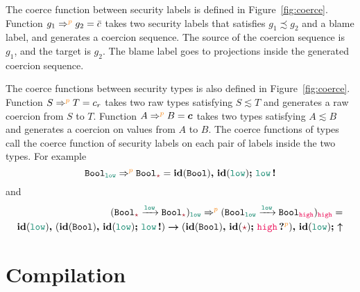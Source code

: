 The coerce function between security labels is defined in
Figure~\ref{fig:coerce}. Function $g_1\Rightarrow^{\bl{p}}g_2=\bar{c}$ takes two
security labels that satisfies $g_1 \precsim g_2$ and a blame label, and
generates a coercion sequence. The source of the coercion sequence is $g_1$, and
the target is $g_2$. The blame label goes to projections inside the generated
coercion sequence.

The coerce functions between security types is also defined in
Figure~\ref{fig:coerce}. Function $S \Rightarrow^{\bl{p}} T = c_r$ takes two raw
types satisfying $S \lesssim T$ and generates a raw coercion from $S$ to $T$.
Function $A \Rightarrow^{\bl{p}} B = \bm{c}$ takes two types satisfying $A
\lesssim B$ and generates a coercion on values from $A$ to $B$. The coerce
functions of types call the coerce function of security labels on each pair of
labels inside the two types. For example
\[
\Bool_{\low} \Rightarrow^{\bl{p}} \Bool_{\unk} = \coerc{\id{\Bool}}{\id{\low}\seq\inj{\low}}
\]
and
\begin{align*}
(\Fun{\Bool_{\unk}}{\low}{\Bool_{\unk}})_{\low} \Rightarrow^{\bl{p}} (\Fun{\Bool_{\low}}{\low}{\Bool_{\high}})_{\high} = &\\
  \coerc{\funco{\id{\low}}{(\coerc{\id{\Bool}}{\id{\low} \seq \inj{\low}})}{(\coerc{\id{\Bool}}{\id{\unk} \seq \proj{\high}{p}})}}{\id{\low} \seq \up} &
\end{align*}

\section{Compilation}
\label{sec:compile-func}

